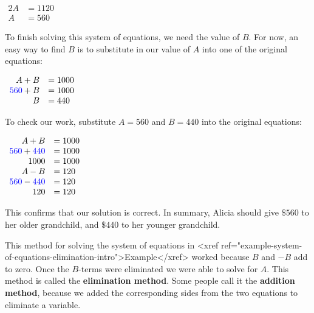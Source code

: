 \documentclass[nooutcomes]{ximera}
\begin{document}
\begin{example}
\begin{center}
$    
    \begin{array}{rl}
          2A&=1120\\
 A&=560
\end{array}
$
\end{center}
To finish solving this system of equations,
        we need the value of $B$.
        For now, an easy way to find $B$ is to substitute in our value of $A$ into one of the original equations:
\begin{center}
$   
\begin{array}{rl}
          A+B&=1000\\
          {\color{blue}{{560}}}+B&=1000\\
B&=440
\end{array}
$
\end{center}  

 To check our work,
        substitute $A=560$ and $B=440$ into the original equations:
\begin{center}
$
\begin{array}{rl}
       A+B&=1000\\ 
          {\color{blue}{{560}}}+{\color{blue}{{440}}}&=1000\\
          1000&=1000\\
A-B&=120\\
{\color{blue}{{560}}}-{\color{blue}{{440}}}&=120\\
120&=120
\end{array}
$
\end{center}
        This confirms that our solution is correct.
        In summary, Alicia should give $\$560$ to her older grandchild,
        and $\$440$ to her younger grandchild.
\end{example}

 This method for solving the system of equations in <xref ref="example-system-of-equations-elimination-intro">Example</xref>
      worked because $B$ and $-B$ add to zero.
      Once the $B$-terms were eliminated we were able to solve for $A$.
      This method is called the \textbf{elimination method}.
      Some people call it the \textbf{addition method},
      because we added the corresponding sides from the two equations to eliminate a variable.
\end{document}
